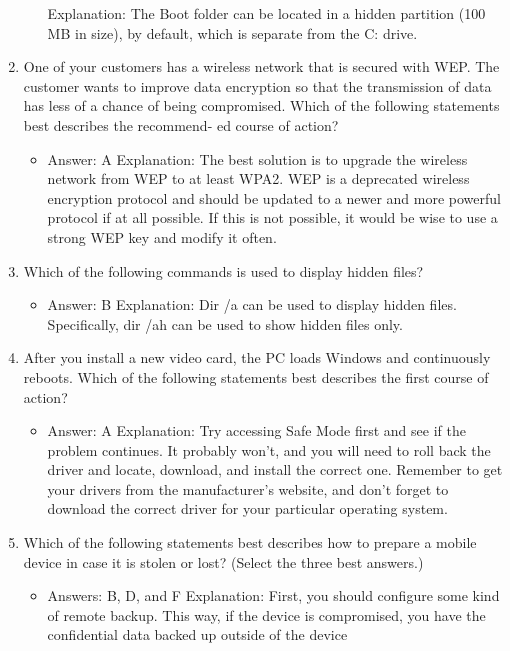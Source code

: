 \documentclass{article}
\begin{document}
\begin{enumerate}
\begin{itemize}
Explanation: The Boot folder can be located in a hidden partition (100 MB in size), by
default, which is separate from the C: drive.
    \end{itemize}
    \item One of your customers has a wireless network that is secured with
WEP. The customer wants to improve data encryption so that the
transmission of data has less of a chance of being compromised.
Which of the following statements best describes the recommend-
ed course of action?
    \begin{itemize}
        \item Answer: A
Explanation: The best solution is to upgrade the wireless network from WEP to at least
WPA2. WEP is a deprecated wireless encryption protocol and should be updated to a
newer and more powerful protocol if at all possible. If this is not possible, it would be
wise to use a strong WEP key and modify it often.
    \end{itemize}
    \item Which of the following commands is used to display hidden files?
    \begin{itemize}
        \item Answer: B
Explanation: Dir /a can be used to display hidden files. Specifically, dir /ah can
be used to show hidden files only.
    \end{itemize}
    \item After you install a new video card, the PC loads Windows and
continuously reboots. Which of the following statements best
describes the first course of action?
    \begin{itemize}
        \item Answer: A
Explanation: Try accessing Safe Mode first and see if the problem continues. It probably
won’t, and you will need to roll back the driver and locate, download, and install
the correct one. Remember to get your drivers from the manufacturer’s website, and
don’t forget to download the correct driver for your particular operating system.
    \end{itemize}
    \item Which of the following statements best describes how to prepare
a mobile device in case it is stolen or lost? (Select the three best
answers.)
    \begin{itemize}
        \item Answers: B, D, and F
Explanation: First, you should configure some kind of remote backup. This way, if the
device is compromised, you have the confidential data backed up outside of the device

\end{itemize}
\end{enumerate}
\end{document}
